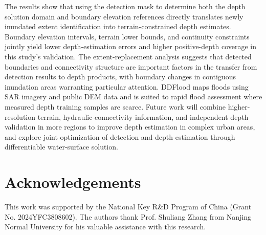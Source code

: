 \documentclass[authoryear,preprint,12pt]{elsarticle}
\begin{document}
The results show that using the detection mask to determine both the depth solution domain and boundary elevation references directly translates newly inundated extent identification into terrain-constrained depth estimates. Boundary elevation intervals, terrain lower bounds, and continuity constraints jointly yield lower depth-estimation errors and higher positive-depth coverage in this study's validation. The extent-replacement analysis suggests that detected boundaries and connectivity structure are important factors in the transfer from detection results to depth products, with boundary changes in contiguous inundation areas warranting particular attention. DDFlood maps floods using SAR imagery and public DEM data and is suited to rapid flood assessment where measured depth training samples are scarce. Future work will combine higher-resolution terrain, hydraulic-connectivity information, and independent depth validation in more regions to improve depth estimation in complex urban areas, and explore joint optimization of detection and depth estimation through differentiable water-surface solution.

\section*{Acknowledgements}

\begin{sloppypar}
This work was supported by the National Key R\&D Program of China (Grant No. 2024YFC3808602). The authors thank Prof. Shuliang Zhang from Nanjing Normal University for his valuable assistance with this research.
\end{sloppypar}



\end{document}
